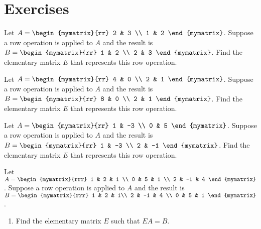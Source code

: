 \section*{Exercises}

\begin{enumialphparenastyle}

\begin{ex}
Let $A = \begin{mymatrix}{rr}
2 & 3 \\
1 & 2 
\end{mymatrix}$. Suppose a row operation is applied to $A$ and the result is $B = \begin{mymatrix}{rr}
1 & 2 \\
2 & 3 
\end{mymatrix}$. Find the elementary matrix $E$ that represents this row operation. 
\end{ex}

\begin{ex} 
Let $A = \begin{mymatrix}{rr}
4 & 0 \\
2 & 1 
\end{mymatrix}$. Suppose a row operation is applied to $A$ and the result is $B = \begin{mymatrix}{rr}
8 & 0 \\
2 & 1 
\end{mymatrix}$. Find the elementary matrix $E$ that represents this row operation. 
\end{ex}

\begin{ex} 
Let $A = \begin{mymatrix}{rr}
1 & -3 \\
0 & 5 
\end{mymatrix}$. Suppose a row operation is applied to $A$ and the result is $B = \begin{mymatrix}{rr}
1 & -3 \\
2 & -1 
\end{mymatrix}$. Find the elementary matrix $E$ that represents this row operation. 
\end{ex}

\begin{ex} 
Let $A = \begin{mymatrix}{rrr}
1 & 2 & 1  \\
0 & 5 & 1 \\
2 & -1 & 4
\end{mymatrix}$. Suppose a row operation is applied to $A$ and the result is $B = \begin{mymatrix}{rrr}
1 & 2 & 1\\
2 & -1 & 4 \\
0 & 5 & 1  
\end{mymatrix}$. 
\begin{enumerate}
\item Find the elementary matrix $E$ such that $EA = B$. 


\end{enumerate}
\end{ex}
\end{enumialphparenastyle}
